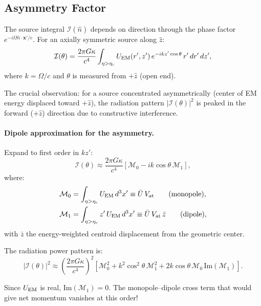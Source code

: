 \documentclass[11pt]{article}
\newcommand{\etac}{\eta_c}
\begin{document}
\subsection{Asymmetry Factor}

The source integral $\mathcal{I}(\hat{n})$ depends on direction through
the phase factor $e^{-i\Omega\hat{n}\cdot\mathbf{x}'/c}$. For an axially
symmetric source along $\hat{z}$:
\begin{equation}
\mathcal{I}(\theta) = \frac{2\pi G\kappa}{c^4} \int_{\eta > \etac}
  U_{\rm EM}(r', z')\,e^{-i k z'\cos\theta}\,r'\,dr'\,dz',
\end{equation}
where $k = \Omega/c$ and $\theta$ is measured from $+\hat{z}$ (open end).

The crucial observation: for a source concentrated asymmetrically
(center of EM energy displaced toward $+\hat{z}$), the radiation pattern
$|\mathcal{I}(\theta)|^2$ is peaked in the forward ($+\hat{z}$) direction
due to constructive interference.

\paragraph{Dipole approximation for the asymmetry.}
Expand to first order in $kz'$:
\begin{equation}
\mathcal{I}(\theta) \approx \frac{2\pi G\kappa}{c^4}\left[
  \mathcal{M}_0 - ik\cos\theta\,\mathcal{M}_1\right],
\end{equation}
where:
\begin{align}
\mathcal{M}_0 &= \int_{\eta > \etac} U_{\rm EM}\,d^3x'
  \equiv \bar{U}\,V_{\rm at} \qquad\text{(monopole)}, \\
\mathcal{M}_1 &= \int_{\eta > \etac} z'\,U_{\rm EM}\,d^3x'
  \equiv \bar{U}\,V_{\rm at}\,\bar{z} \qquad\text{(dipole)},
\end{align}
with $\bar{z}$ the energy-weighted centroid displacement from the
geometric center.

The radiation power pattern is:
\begin{equation}
|\mathcal{I}(\theta)|^2 \approx \left(\frac{2\pi G\kappa}{c^4}\right)^2
  \left[\mathcal{M}_0^2 + k^2\cos^2\theta\,\mathcal{M}_1^2
  + 2k\cos\theta\,\mathcal{M}_0\,\text{Im}(\mathcal{M}_1)\right].
\end{equation}

Since $U_{\rm EM}$ is real, $\text{Im}(\mathcal{M}_1) = 0$. The
monopole--dipole cross term that would give net momentum vanishes
at this order!
\end{document}
